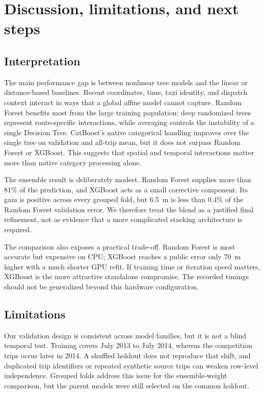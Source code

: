 \section{Discussion, limitations, and next steps}

\subsection{Interpretation}

The main performance gap is between nonlinear tree models and the linear or distance-based baselines.  Recent coordinates, time, taxi identity, and dispatch context interact in ways that a global affine model cannot capture.  Random Forest benefits most from the large training population: deep randomized trees represent route-specific interactions, while averaging controls the instability of a single Decision Tree.  CatBoost's native categorical handling improves over the single tree on validation and all-trip mean, but it does not surpass Random Forest or XGBoost.  This suggests that spatial and temporal interactions matter more than native category processing alone.

The ensemble result is deliberately modest.  Random Forest supplies more than 81\% of the prediction, and XGBoost acts as a small corrective component.  Its gain is positive across every grouped fold, but 6.5~m is less than 0.4\% of the Random Forest validation error.  We therefore treat the blend as a justified final refinement, not as evidence that a more complicated stacking architecture is required.

The comparison also exposes a practical trade-off.  Random Forest is most accurate but expensive on CPU; XGBoost reaches a public error only 70~m higher with a much shorter GPU refit.  If training time or iteration speed matters, XGBoost is the more attractive standalone compromise.  The recorded timings should not be generalized beyond this hardware configuration.

\subsection{Limitations}

Our validation design is consistent across model families, but it is not a blind temporal test.  Training covers July 2013 to July 2014, whereas the competition trips occur later in 2014.  A shuffled holdout does not reproduce that shift, and duplicated trip identifiers or repeated synthetic source trips can weaken row-level independence.  Grouped folds address this issue for the ensemble-weight comparison, but the parent models were still selected on the common holdout.

